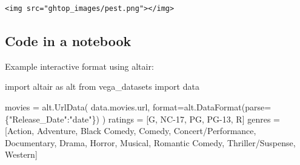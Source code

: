 \documentclass[
  letterpaper,
  DIV=11,
  numbers=noendperiod]{scrartcl}
\newenvironment{Shaded}{\begin{snugshade}}{\end{snugshade}}
\newcommand{\BuiltInTok}[1]{\textcolor[rgb]{0.00,0.23,0.31}{#1}}
\newcommand{\ImportTok}[1]{\textcolor[rgb]{0.00,0.46,0.62}{#1}}
\newcommand{\NormalTok}[1]{\textcolor[rgb]{0.00,0.23,0.31}{#1}}
\newcommand{\OperatorTok}[1]{\textcolor[rgb]{0.37,0.37,0.37}{#1}}
\newcommand{\StringTok}[1]{\textcolor[rgb]{0.13,0.47,0.30}{#1}}
\begin{document}
\begin{verbatim}
<img src="ghtop_images/pest.png"></img>
\end{verbatim}

\hypertarget{code-in-a-notebook}{%
\subsection{Code in a notebook}\label{code-in-a-notebook}}

Example interactive format using altair:

\begin{Shaded}
\begin{Highlighting}[]
\ImportTok{import}\NormalTok{ altair }\ImportTok{as}\NormalTok{ alt}
\ImportTok{from}\NormalTok{ vega\_datasets }\ImportTok{import}\NormalTok{ data}

\NormalTok{movies }\OperatorTok{=}\NormalTok{ alt.UrlData(}
\NormalTok{    data.movies.url,}
    \BuiltInTok{format}\OperatorTok{=}\NormalTok{alt.DataFormat(parse}\OperatorTok{=}\NormalTok{\{}\StringTok{"Release\_Date"}\NormalTok{:}\StringTok{"date"}\NormalTok{\})}
\NormalTok{)}
\NormalTok{ratings }\OperatorTok{=}\NormalTok{ [}\StringTok{\textquotesingle{}G\textquotesingle{}}\NormalTok{, }\StringTok{\textquotesingle{}NC{-}17\textquotesingle{}}\NormalTok{, }\StringTok{\textquotesingle{}PG\textquotesingle{}}\NormalTok{, }\StringTok{\textquotesingle{}PG{-}13\textquotesingle{}}\NormalTok{, }\StringTok{\textquotesingle{}R\textquotesingle{}}\NormalTok{]}
\NormalTok{genres }\OperatorTok{=}\NormalTok{ [}\StringTok{\textquotesingle{}Action\textquotesingle{}}\NormalTok{, }\StringTok{\textquotesingle{}Adventure\textquotesingle{}}\NormalTok{, }\StringTok{\textquotesingle{}Black Comedy\textquotesingle{}}\NormalTok{, }\StringTok{\textquotesingle{}Comedy\textquotesingle{}}\NormalTok{,}
       \StringTok{\textquotesingle{}Concert/Performance\textquotesingle{}}\NormalTok{, }\StringTok{\textquotesingle{}Documentary\textquotesingle{}}\NormalTok{, }\StringTok{\textquotesingle{}Drama\textquotesingle{}}\NormalTok{, }\StringTok{\textquotesingle{}Horror\textquotesingle{}}\NormalTok{, }\StringTok{\textquotesingle{}Musical\textquotesingle{}}\NormalTok{,}
       \StringTok{\textquotesingle{}Romantic Comedy\textquotesingle{}}\NormalTok{, }\StringTok{\textquotesingle{}Thriller/Suspense\textquotesingle{}}\NormalTok{, }\StringTok{\textquotesingle{}Western\textquotesingle{}}\NormalTok{]}


\end{Highlighting}
\end{Shaded}
\end{document}
